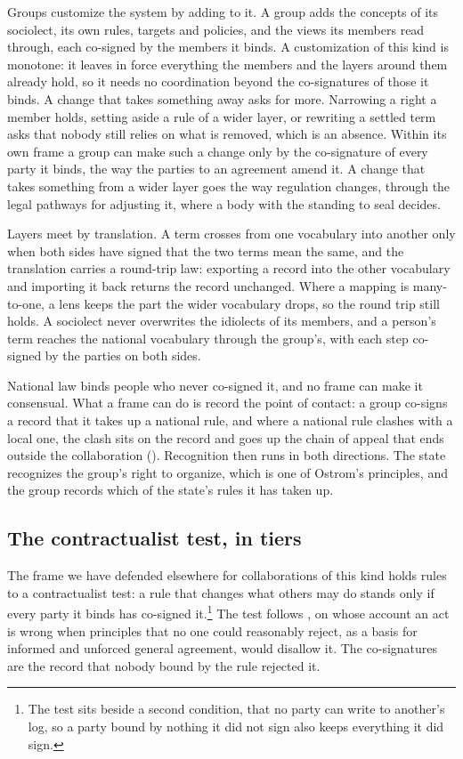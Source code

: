 Groups customize the system by adding to it. A group adds the concepts of its sociolect, its own
rules, targets and policies, and the views its members read through, each co-signed by the members
it binds. A customization of this kind is monotone: it leaves in force everything the members and
the layers around them already hold, so it needs no coordination beyond the co-signatures of those
it binds. A change that takes something away asks for more. Narrowing a right a member holds, setting aside a rule of a wider layer, or rewriting a settled term asks that nobody still
relies on what is removed, which is an absence. Within its own frame a group can make such a change
only by the co-signature of every party it binds, the way the parties to an agreement amend it. A
change that takes something from a wider layer goes the way regulation changes, through the legal
pathways for adjusting it, where a body with the standing to seal decides.

Layers meet by translation. A term crosses from one vocabulary into another only when both sides
have signed that the two terms mean the same, and the translation carries a round-trip law:
exporting a record into the other vocabulary and importing it back returns the record unchanged.
Where a mapping is many-to-one, a lens keeps the part the wider vocabulary drops, so the round trip
still holds. A sociolect never overwrites the idiolects of its members, and a person's term reaches
the national vocabulary through the group's, with each step co-signed by the parties on both sides.

National law binds people who never co-signed it, and no frame can make it consensual. What a frame can do is record the point of contact: a group
co-signs a record that it takes up a national rule, and where a national rule clashes with a local
one, the clash sits on the record and goes up the chain of appeal that ends outside the
collaboration (). Recognition then runs in both directions. The state recognizes
the group's right to organize, which is one of Ostrom's principles, and the group records which of
the state's rules it has taken up.

\subsection{The contractualist test, in tiers}\label{sec:tiers}

The frame we have defended elsewhere for collaborations of this kind holds rules to a
contractualist test: a rule that changes what others may do stands only if every party it binds has
co-signed it.\footnote{The test sits beside a second condition, that no party can write to another's
log, so a party bound by nothing it did not sign also keeps everything it did sign.} The test follows
\citet[p.~153]{scanlon1998}, on whose account an act is wrong when principles that no one could reasonably
reject, as a basis for informed and unforced general agreement, would disallow it. The co-signatures
are the record that nobody bound by the rule rejected it.

